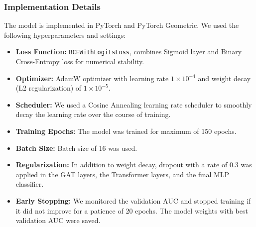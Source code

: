 \documentclass[10pt]{article}
\begin{document}
\subsubsection{Implementation Details}
The model is implemented in PyTorch and PyTorch Geometric. We used the following hyperparameters and settings:
\begin{itemize}
    \item \textbf{Loss Function:} \texttt{BCEWithLogitsLoss}, combines Sigmoid layer and Binary Cross-Entropy loss for numerical stability.
    \item \textbf{Optimizer:} AdamW optimizer with learning rate $1 \times 10^{-4}$ and weight decay (L2 regularization) of $1 \times 10^{-5}$.
    \item \textbf{Scheduler:} We used a Cosine Annealing learning rate scheduler to smoothly decay the learning rate over the course of training.
    \item \textbf{Training Epochs:} The model was trained for maximum of 150 epochs.
    \item \textbf{Batch Size:} Batch size of 16 was used.
    \item \textbf{Regularization:} In addition to weight decay, dropout with a rate of 0.3 was applied in the GAT layers, the Transformer layers, and the final MLP classifier.
    \item \textbf{Early Stopping:} We monitored the validation AUC and stopped training if it did not improve for a patience of 20 epochs. The model weights with best validation AUC were saved.
\end{itemize}
\end{document}
